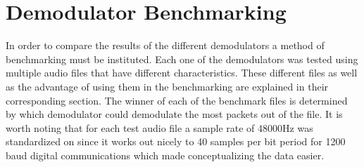 \chapter{Demodulator Benchmarking}
In order to compare the results of the different demodulators a method of benchmarking must be instituted. Each one of the demodulators was tested using multiple audio files that have different characteristics. These different files as well as the advantage of using them in the benchmarking are explained in their corresponding section. The winner of each of the benchmark files is determined by which demodulator could demodulate the most packets out of the file. It is worth noting that for each test audio file a sample rate of 48000Hz was standardized on since it works out nicely to 40 samples per bit period for 1200 baud digital communications which made conceptualizing the data easier. 

